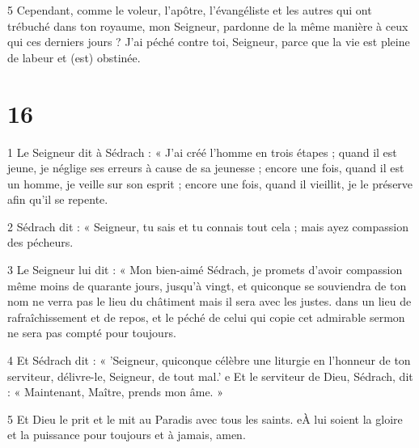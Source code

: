 \par 5 Cependant, comme le voleur, l'apôtre, l'évangéliste et les autres qui ont trébuché dans ton royaume, mon Seigneur, pardonne de la même manière à ceux qui ces derniers jours ? J'ai péché contre toi, Seigneur, parce que la vie est pleine de labeur et (est) obstinée.

\chapter{16}

\par 1 Le Seigneur dit à Sédrach : « J'ai créé l'homme en trois étapes ; quand il est jeune, je néglige ses erreurs à cause de sa jeunesse ; encore une fois, quand il est un homme, je veille sur son esprit ; encore une fois, quand il vieillit, je le préserve afin qu'il se repente.

\par 2 Sédrach dit : « Seigneur, tu sais et tu connais tout cela ; mais ayez compassion des pécheurs.

\par 3 Le Seigneur lui dit : « Mon bien-aimé Sédrach, je promets d'avoir compassion même moins de quarante jours, jusqu'à vingt, et quiconque se souviendra de ton nom ne verra pas le lieu du châtiment mais il sera avec les justes. dans un lieu de rafraîchissement et de repos, et le péché de celui qui copie cet admirable sermon ne sera pas compté pour toujours.

\par 4 Et Sédrach dit : « 'Seigneur, quiconque célèbre une liturgie en l'honneur de ton serviteur, délivre-le, Seigneur, de tout mal.' e Et le serviteur de Dieu, Sédrach, dit : « Maintenant, Maître, prends mon âme. »

\par 5 Et Dieu le prit et le mit au Paradis avec tous les saints. eÀ lui soient la gloire et la puissance pour toujours et à jamais, amen.




